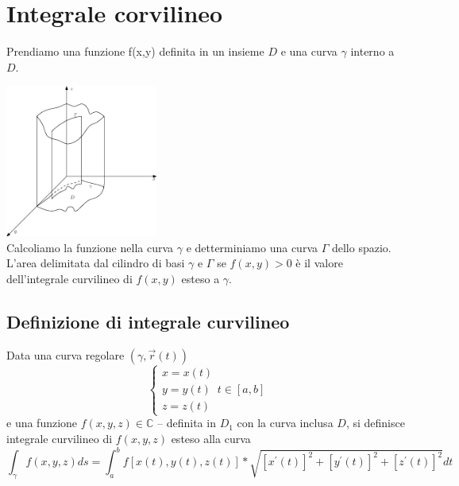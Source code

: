 \documentclass{book}
\begin{document}
\section{Integrale corvilineo}
Prendiamo una funzione f(x,y) definita in un insieme $D$ e una curva $\gamma$
interno a $D$.
\begin{multicols}{2}
	\includegraphics[width=5cm]{img/finiti/integrale_curvilineo.eps}\\
	Calcoliamo la funzione nella curva $\gamma$ e detterminiamo una curva
	$\Gamma$ dello spazio.\\
	L'area delimitata dal cilindro di basi $\gamma$ e $\Gamma$ se $f(x,y)>0$ è
	il valore {\color{red}dell'integrale curvilineo} di $f(x,y)$ esteso a
	$\gamma$.
\end{multicols}
\subsection{Definizione di integrale curvilineo}
Data una curva regolare $(\gamma, \vec{r}(t))$
\begin{equation}
	\begin{cases}
		x=x(t)\\
		y=y(t)\\
		z=z(t)
	\end{cases} t\in [a,b]
\end{equation} 
e una funzione $f(x,y,z)\in \mathds{C}$ -- definita in $D_1$ con la curva
inclusa $D$, si definisce {\color{red}integrale curvilineo} di $f(x,y,z)$
esteso alla curva
\begin{equation*}
	\int_{\gamma} f(x,y,z) ds=
	\int_{a}^{b}f[x(t),y(t),z(t)]*\sqrt{[x^\prime(t)]^2+[y^\prime(t)]^2+[z^\prime(t)]^2}
	dt
\end{equation*}
\end{document}
